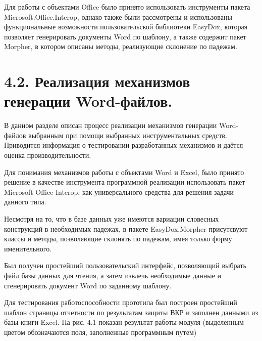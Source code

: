 Для работы с объектами Office было принято использовать инструменты пакета Microsoft.Office.Interop, однако также были рассмотрены и использованы функциональные возможности пользовательской библиотеки EasyDox, которая позволяет генерировать документы Word по шаблону, а также содержит пакет Morpher, в котором описаны методы, реализующие склонение по падежам.

\section{4.2. Реализация механизмов генерации Word-файлов.}

В данном разделе описан процесс реализации механизмов генерации Word-файлов выбранным при помощи выбранных инструментальных средств. Приводится информация о тестировании разработанных механизмов и даётся оценка производительности.

Для понимания механизмов работы с объектами Word и Excel, было принято решение в качестве инструмента программной реализации использовать пакет Microsoft Office Interop,  как универсального средства для решения задачи данного типа.

Несмотря на то, что в базе данных уже имеются вариации словесных конструкций в необходимых падежах, в пакете EasyDox.Morpher присутсвуют классы и методы, позволяющие склонять по падежам, имея только форму именительного.

Был получен простейший пользовательский интерфейс, позволяющий выбрать файл базы данных для чтения, а затем извлечь необходимые данные и сгенерировать документ Word по заданному шаблону. 

Для тестирования работоспособности прототипа был построен простейший шаблон страницы отчетности по результатам защиты ВКР и заполнен данными из базы книги Excel. На рис. 4.1 показан результат работы модуля (выделенным цветом обозначаются поля, заполненные программным путем)

